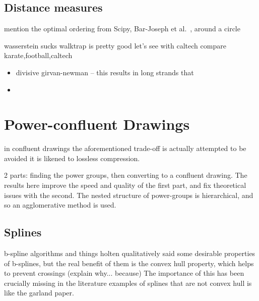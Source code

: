 \subsection{Distance measures}

mention the optimal ordering from Scipy, Bar-Joseph et al.~\cite{TODO}, around a circle

wasserstein sucks
walktrap is pretty good
let's see with caltech
compare karate,football,caltech

\begin{itemize}
    \item divisive girvan-newman -- this results in long strands that
    \item
\end{itemize}

\section{Power-confluent Drawings}
in confluent drawings the aforementioned trade-off is actually attempted to be avoided
it is likened to lossless compression.

2 parts: finding the power groups, then converting to a confluent drawing. The results here improve the speed and quality of the first part, and fix theoretical issues with the second.
The nested structure of power-groups is hierarchical, and so an agglomerative method is used.
\subsection{Splines}
b-spline algorithms and things
holten qualitatively said some desirable properties of b-splines, but the real benefit of them is the convex hull property, which helps to prevent crossings (explain why... because)
The importance of this has been crucially missing in the literature
examples of splines that are not convex hull is like the garland paper.

